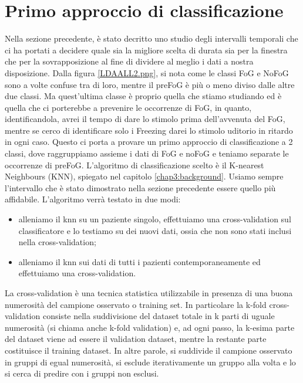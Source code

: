 \section{Primo approccio di classificazione}
Nella sezione precedente, è stato decritto uno studio degli intervalli temporali che ci ha portati a decidere quale sia la migliore scelta di durata sia per la finestra che per la sovrapposizione al fine di dividere al meglio i dati a nostra disposizione. Dalla figura \ref{LDAALL2.png}, si nota come le classi FoG e NoFoG sono a volte confuse tra di loro, mentre il preFoG è più o meno diviso dalle altre due classi. Ma quest'ultima classe è proprio quella che stiamo studiando ed è quella che ci porterebbe a prevenire le occorrenze di FoG, in quanto, identificandola, avrei il tempo di dare lo stimolo prima dell'avvenuta del FoG, mentre se cerco di identificare solo i Freezing darei lo stimolo uditorio in ritardo in ogni caso. Questo ci porta a provare un primo approccio di classificazione a 2 classi, dove raggruppiamo assieme i dati di FoG e noFoG e teniamo separate le occorrenze di preFoG. L'algoritmo  di classificazione scelto è il K-nearest Neighbours (KNN), spiegato nel capitolo \ref{chap3:background}. Usiamo sempre l'intervallo che è stato dimostrato nella sezione precedente essere quello più affidabile. L'algoritmo verrà testato in due modi:
\begin{itemize}
	\item alleniamo il knn su un paziente singolo, effettuiamo una cross-validation sul classificatore e lo testiamo su dei nuovi dati, ossia che non sono stati inclusi nella  cross-validation;
	\item alleniamo il knn sui dati di tutti i pazienti contemporaneamente ed effettuiamo una cross-validation.
\end{itemize}
La cross-validation è una tecnica statistica utilizzabile in presenza di una buona numerosità del campione osservato o training set. In particolare la k-fold cross-validation consiste nella suddivisione del dataset totale in k parti di uguale numerosità (si chiama anche k-fold validation) e, ad ogni passo, la k-esima parte del dataset viene ad essere il validation dataset, mentre la restante parte costituisce il training dataset. In altre parole, si suddivide il campione osservato in gruppi di egual numerosità, si esclude iterativamente un gruppo alla volta e lo si cerca di predire con i gruppi non esclusi.\\
